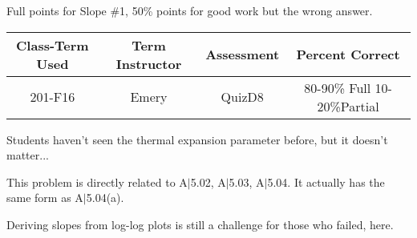 \begin{rubric}
	Full points for Slope \#1, 50\% points for good work but the wrong answer.
\end{rubric}

\begin{outcomes}
	\begin{center}
		\begin{tabular}{cccc}
			\hline\hline
			Class-Term Used & Term Instructor & Assessment & Percent Correct\\
			\hline
			201-F16 & Emery & QuizD8 & 80-90\% Full 10-20\%Partial \\
			\hline
		\end{tabular}
	\end{center}
\end{outcomes}

\begin{comments}
	Students haven't seen the thermal expansion parameter before, but it doesn't matter...
	
	This problem is directly related to A$|$5.02, A$|$5.03, A$|$5.04. It actually has the same form as A$|$5.04(a).

Deriving slopes from log-log plots is still a challenge for those who failed, here.	

\end{comments}

